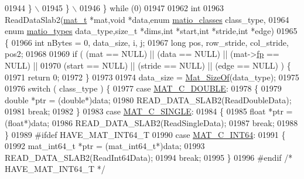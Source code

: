 \begin{DoxyCode}
{{{{{{{{{01944 \textcolor{preprocessor}{            \} \(\backslash\)}
01945 \textcolor{preprocessor}{        \} \(\backslash\)}
01946 \textcolor{preprocessor}{    \} while (0)}
01947 
01962 \textcolor{keywordtype}{int}
01963 ReadDataSlab2(\hyperlink{struct__mat__t}{mat\_t} *mat,\textcolor{keywordtype}{void} *data,\textcolor{keyword}{enum} \hyperlink{group___m_a_t_gad4d60ae7b709fc81bfd744fb4c857c40}{matio\_classes} class\_type,
01964     \textcolor{keyword}{enum} \hyperlink{group___m_a_t_gacf7b3b879282b7ab3a51190e49bf3453}{matio\_types} data\_type,\textcolor{keywordtype}{size\_t} *dims,\textcolor{keywordtype}{int} *start,\textcolor{keywordtype}{int} *stride,\textcolor{keywordtype}{int} *edge)
01965 \{
01966     \textcolor{keywordtype}{int} nBytes = 0, data\_size, i, j;
01967     \textcolor{keywordtype}{long} pos, row\_stride, col\_stride, pos2;
01968 
01969     \textcolor{keywordflow}{if} ( (mat   == NULL) || (data   == NULL) || (mat->\hyperlink{struct__mat__t_a85f562e407ca9ad4d2a6e14f839432b7}{fp} == NULL) ||
01970          (start == NULL) || (stride == NULL) || (edge    == NULL) ) \{
01971         \textcolor{keywordflow}{return} 0;
01972     \}
01973 
01974     data\_size = \hyperlink{group__mat__util_gab6774aabdc124c540c1e7686d0804940}{Mat\_SizeOf}(data\_type);
01975 
01976     \textcolor{keywordflow}{switch} ( class\_type ) \{
01977         \textcolor{keywordflow}{case} \hyperlink{group___m_a_t_ggad4d60ae7b709fc81bfd744fb4c857c40a5d70e0862e5bdb7bd86bf7ba5948f307}{MAT\_C\_DOUBLE}:
01978         \{
01979             \textcolor{keywordtype}{double} *ptr = (\textcolor{keywordtype}{double}*)data;
01980             READ\_DATA\_SLAB2(ReadDoubleData);
01981             \textcolor{keywordflow}{break};
01982         \}
01983         \textcolor{keywordflow}{case} \hyperlink{group___m_a_t_ggad4d60ae7b709fc81bfd744fb4c857c40a2825631e26a961cbe0f79db50a39cea2}{MAT\_C\_SINGLE}:
01984         \{
01985             \textcolor{keywordtype}{float} *ptr = (\textcolor{keywordtype}{float}*)data;
01986             READ\_DATA\_SLAB2(ReadSingleData);
01987             \textcolor{keywordflow}{break};
01988         \}
01989 \textcolor{preprocessor}{#ifdef HAVE\_MAT\_INT64\_T}
01990         \textcolor{keywordflow}{case} \hyperlink{group___m_a_t_ggad4d60ae7b709fc81bfd744fb4c857c40a1ea83bcde49b35477494412973f82409}{MAT\_C\_INT64}:
01991         \{
01992             mat\_int64\_t *ptr = (mat\_int64\_t*)data;
01993             READ\_DATA\_SLAB2(ReadInt64Data);
01994             \textcolor{keywordflow}{break};
01995         \}
01996 \textcolor{preprocessor}{#endif }\textcolor{comment}{/* HAVE\_MAT\_INT64\_T */}\textcolor{preprocessor}{}
}}}}}}}}}
\end{DoxyCode}
